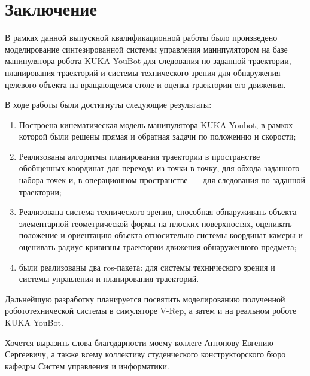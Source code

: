 \newpage
\section*{Заключение}
\nocite{aldoma2012tutorial}\nocite{papon2013voxel}

В рамках данной выпускной квалификационной работы было произведено моделирование синтезированной системы управления манипулятором на базе манипулятора робота KUKA YouBot  для следования по заданной траектории, планирования траекторий и системы технического зрения для обнаружения целевого объекта на вращающемся столе и оценка траектории его движения.

В ходе работы были достигнуты следующие результаты:

\begin{enumerate}
	\item Построена кинематическая модель манипулятора KUKA Youbot, в рамкох которой были решены прямая и обратная задачи по положению и скорости;
	\item Реализованы алгоритмы планирования траектории в пространстве обобщенных координат для перехода из точки в точку, для обхода заданного набора точек и, в операционном пространстве~--- для следования по заданной траектории;
	\item Реализована система технического зрения, способная обнаруживать объекта элементарной геометрической формы на плоских поверхностях, оценивать положение и ориентацию объекта относительно системы координат камеры и оценивать радиус кривизны траектории движения обнаруженного предмета;
	\item были реализованы два ros-пакета: для системы технического зрения и системы управления и планирования траекторий.
\end{enumerate}

Дальнейшую разработку планируется посвятить моделированию полученной робототехнической системы в симуляторе V-Rep, а затем и на реальном роботе KUKA YouBot.

Хочется выразить слова благодарности моему коллеге Антонову Евгению Сергеевичу, а также всему коллективу студенческого конструкторского бюро кафедры Систем управления и информатики.

\newpage